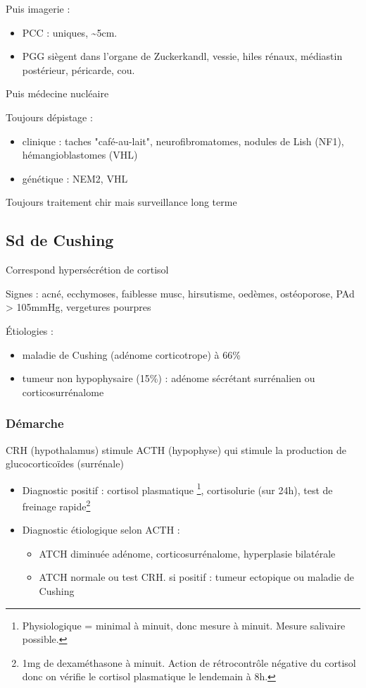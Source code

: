 \documentclass[11pt]{article}
\begin{document}
Puis imagerie : 
\begin{itemize}
\item PCC : uniques, \textasciitilde{}5cm.
\item PGG siègent dans l'organe de Zuckerkandl, vessie, hiles rénaux, médiastin postérieur, péricarde, cou.
\end{itemize}

Puis médecine nucléaire

Toujours dépistage :
\begin{itemize}
\item clinique : taches "café-au-lait", neurofibromatomes, nodules de Lish (NF1),
hémangioblastomes (VHL)
\item génétique : NEM2, VHL
\end{itemize}

Toujours traitement chir mais surveillance long terme

\subsection{Sd de Cushing}
\label{sec:org9e89780}
Correspond hypersécrétion de cortisol

Signes : acné, ecchymoses, faiblesse musc, hirsutisme, oedèmes, ostéoporose, PAd
> 105mmHg, vergetures pourpres

Étiologies :
\begin{itemize}
\item maladie de Cushing (adénome corticotrope) à 66\%
\item tumeur non hypophysaire (15\%) : adénome sécrétant surrénalien ou
corticosurrénalome
\end{itemize}

\subsubsection{Démarche}
\label{sec:orgb7ef076}
\begin{tcolorbox}
CRH (hypothalamus) stimule ACTH (hypophyse) qui stimule la production de
glucocorticoïdes (surrénale)
\end{tcolorbox}

\begin{itemize}
\item Diagnostic positif : cortisol plasmatique \footnote{Physiologique = minimal à minuit, donc mesure à minuit. Mesure salivaire possible.}, cortisolurie (sur 24h), test de freinage rapide\footnote{1mg de dexaméthasone à minuit. Action de rétrocontrôle négative du
cortisol donc on vérifie le cortisol plasmatique le lendemain à 8h.}

\item Diagnostic étiologique selon ACTH :
\begin{itemize}
\item ATCH diminuée \thus adénome, corticosurrénalome, hyperplasie bilatérale
\item ATCH normale ou \inc \thus test CRH. si positif : tumeur ectopique ou
maladie de Cushing
\end{itemize}
\end{itemize}
\end{document}
